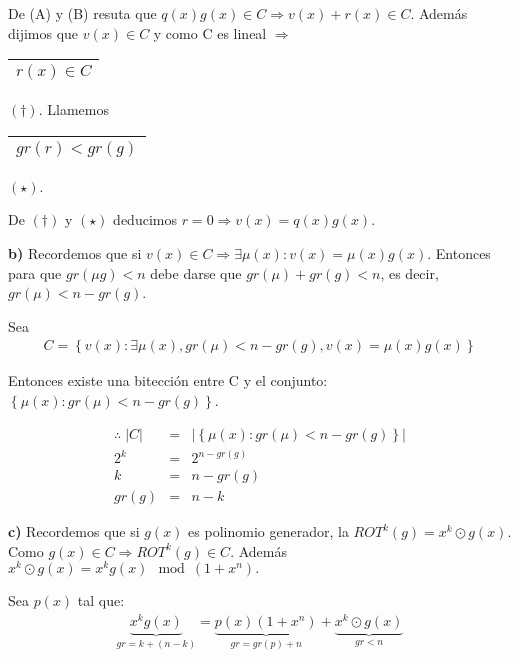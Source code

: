 \documentclass[12pt,a4paper]{report}
\begin{document}
		\vspace{3mm}
		De (A) y (B) resuta que $q(x) g(x) \in C \Rightarrow v(x) + r(x) \in C$. Además dijimos que $v(x) \in C$ y como C es lineal $\Rightarrow$ \begin{tabular}{|c|} \hline $r(x) \in C$ \\ \hline \end{tabular} $(\dag)$. Llamemos \begin{tabular}{|c|} \hline $gr(r) < gr(g) $ \\ \hline \end{tabular} $(\star)$.

		\vspace{5mm}
		De $(\dag)$ y $(\star)$ deducimos $r = 0 \Rightarrow v(x) = q(x) g(x)$.

		\vspace{5mm}
		\textbf{b)} Recordemos que si $ v(x) \in C \Rightarrow \exists \mu(x) : v(x) = \mu(x) g(x)$. Entonces para que $gr(\mu g) < n$ debe darse que $gr(\mu) + gr(g) < n$, es decir, $gr(\mu) < n - gr(g)$.

		\vspace{3mm}
		Sea
		\begin{eqnarray}
			\nonumber C = \left\lbrace v(x) : \exists \mu(x), gr(\mu) < n - gr(g), v(x) = \mu(x) g(x) \right\rbrace
		\end{eqnarray}

		Entonces existe una bitección entre C y el conjunto: $\left\lbrace \mu(x) :  gr(\mu) < n - gr(g) \right\rbrace$.

		\begin{eqnarray}
			\nonumber \therefore \; \lvert C \rvert &=& \lvert \left\lbrace \mu(x) : gr(\mu) < n - gr(g) \right\rbrace \rvert \\
			\nonumber 2^{k} &=& 2^{n - gr(g)} \\
			\nonumber k &=& n -gr(g) \\
			\nonumber gr(g) &=& n - k
		\end{eqnarray}

		\textbf{c)} Recordemos que si $g(x)$ es polinomio generador, la $ROT^{k}(g) = x^{k} \odot g(x)$. Como $g(x) \in C \Rightarrow ROT^{k}(g) \in C$. Además $x^{k} \odot g(x) = x^{k} g(x) \mod (1 + x^{n}).$

		Sea $p(x)$ tal que:
		\begin{eqnarray}
			\nonumber \underbrace{x^{k} g(x)}_{gr = k + (n - k)} = \underbrace{p(x) (1 + x^{n})}_{gr = gr(p) + n} + \underbrace{x^{k} \odot g(x)}_{gr < n}
		\end{eqnarray}
\end{document}
